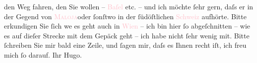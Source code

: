                     den Weg fahren, den Sie wollen – \textcolor{pink}{Baſel}{}\ledrightnote{\textcolor{pink}{Basel}} etc.
                    – und ich möchte ſehr gern, daſs er in der Gegend von \textcolor{pink}{\textsc{Maloja}}{}\ledrightnote{\textcolor{pink}{Maloja}}{ }{\pb}oder ſonſtwo in der
                    ſüdöſtlichen \textcolor{pink}{Schweiz}{}\ledrightnote{\textcolor{pink}{Schweiz}} aufhörte. Bitte
                    erkundigen Sie ſich we{\geminationn} es geht auch in \textcolor{pink}{Wien}{}\ledrightnote{\textcolor{pink}{Wien}} – ich bin hier ſo abgeſchnitten – wie es auf
                    dieſer Strecke mit dem Gepäck geht – ich habe nicht ſehr wenig mit. Bitte
                    ſchreiben Sie mir bald eine Zeile, und ſagen mir, daſs es Ihnen recht iſt, ich
                    freu mich ſo darauf. Ihr \spacefill\mbox{Hugo.}\pend
           \endnumbering{}  
      